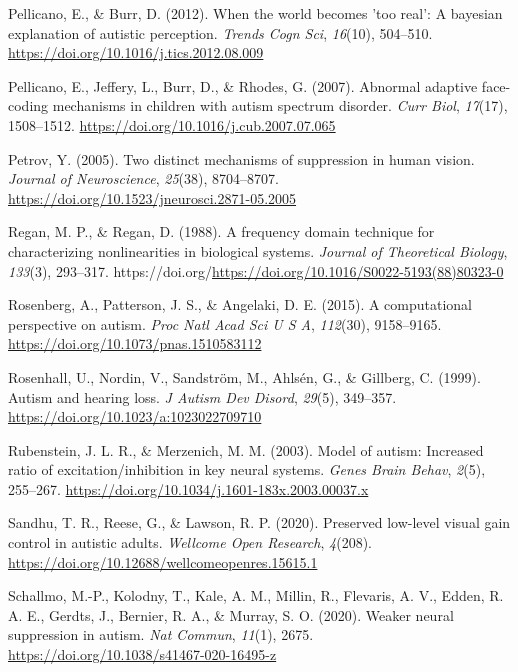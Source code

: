 \documentclass[
]{article}
\newlength{\cslhangindent}
\newlength{\cslentryspacingunit} %
\newenvironment{CSLReferences}[2] %
 {%
  \setlength{\parindent}{0pt}
  \ifodd #1
  \let\oldpar\par
  \def\par{\hangindent=\cslhangindent\oldpar}
  \fi
  \setlength{\parskip}{#2\cslentryspacingunit}
 }%
 {}
\begin{document}
\begin{CSLReferences}{1}{0}
\leavevmode{}%
Pellicano, E., \& Burr, D. (2012). When the world becomes 'too real': A bayesian explanation of autistic perception. \emph{Trends Cogn Sci}, \emph{16}(10), 504--510. \url{https://doi.org/10.1016/j.tics.2012.08.009}

\leavevmode{}%
Pellicano, E., Jeffery, L., Burr, D., \& Rhodes, G. (2007). Abnormal adaptive face-coding mechanisms in children with autism spectrum disorder. \emph{Curr Biol}, \emph{17}(17), 1508--1512. \url{https://doi.org/10.1016/j.cub.2007.07.065}

\leavevmode{}%
Petrov, Y. (2005). Two distinct mechanisms of suppression in human vision. \emph{Journal of Neuroscience}, \emph{25}(38), 8704--8707. \url{https://doi.org/10.1523/jneurosci.2871-05.2005}

\leavevmode{}%
Regan, M. P., \& Regan, D. (1988). A frequency domain technique for characterizing nonlinearities in biological systems. \emph{Journal of Theoretical Biology}, \emph{133}(3), 293--317. https://doi.org/\url{https://doi.org/10.1016/S0022-5193(88)80323-0}

\leavevmode{}%
Rosenberg, A., Patterson, J. S., \& Angelaki, D. E. (2015). A computational perspective on autism. \emph{Proc Natl Acad Sci U S A}, \emph{112}(30), 9158--9165. \url{https://doi.org/10.1073/pnas.1510583112}

\leavevmode{}%
Rosenhall, U., Nordin, V., Sandström, M., Ahlsén, G., \& Gillberg, C. (1999). Autism and hearing loss. \emph{J Autism Dev Disord}, \emph{29}(5), 349--357. \url{https://doi.org/10.1023/a:1023022709710}

\leavevmode{}%
Rubenstein, J. L. R., \& Merzenich, M. M. (2003). Model of autism: Increased ratio of excitation/inhibition in key neural systems. \emph{Genes Brain Behav}, \emph{2}(5), 255--267. \url{https://doi.org/10.1034/j.1601-183x.2003.00037.x}

\leavevmode{}%
Sandhu, T. R., Reese, G., \& Lawson, R. P. (2020). Preserved low-level visual gain control in autistic adults. \emph{Wellcome Open Research}, \emph{4}(208). \url{https://doi.org/10.12688/wellcomeopenres.15615.1}

\leavevmode{}%
Schallmo, M.-P., Kolodny, T., Kale, A. M., Millin, R., Flevaris, A. V., Edden, R. A. E., Gerdts, J., Bernier, R. A., \& Murray, S. O. (2020). Weaker neural suppression in autism. \emph{Nat Commun}, \emph{11}(1), 2675. \url{https://doi.org/10.1038/s41467-020-16495-z}


\end{CSLReferences}
\end{document}

